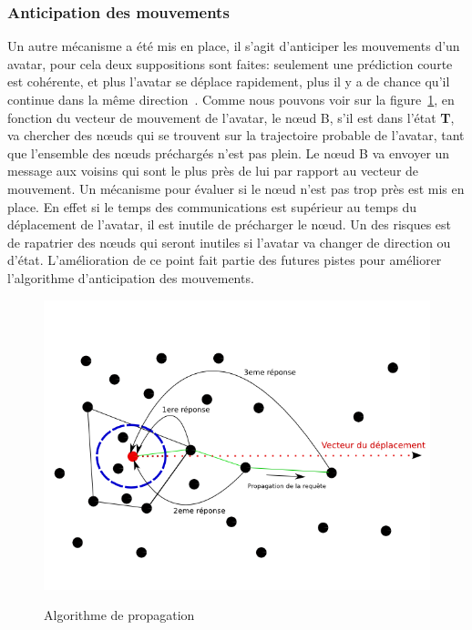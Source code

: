 



	\subsubsection{Anticipation des mouvements}
	Un autre mécanisme a été mis en place, il s'agit d'anticiper les mouvements d'un avatar, pour cela deux suppositions sont faites: seulement une prédiction courte est cohérente, et plus l'avatar se déplace rapidement, plus il y a de chance qu'il continue dans la même direction~\cite{191}. Comme nous pouvons voir sur la figure~\ref{Propa_Algo}, en fonction du vecteur de mouvement de l'avatar, le nœud B, s'il est dans l'état \textbf{T}, va chercher des nœuds qui se trouvent sur la trajectoire probable de l'avatar, tant que l'ensemble des nœuds préchargés n'est pas plein. Le nœud B va envoyer un message aux voisins qui sont le plus près de lui par rapport au vecteur de mouvement. Un mécanisme pour évaluer si le nœud n'est pas trop près est mis en place. En effet si le temps des communications est supérieur au temps du déplacement de l'avatar, il est inutile de précharger le nœud. Un des risques est de rapatrier des nœuds qui seront inutiles si l'avatar va changer de direction ou d'état. L'amélioration de ce point fait partie des futures pistes pour améliorer l'algorithme d'anticipation des mouvements.\\
	\vspace{5mm}
        \begin{figure}[!h]
        \centering
        \includegraphics[scale=0.5]{./Ressources/Images/propagation_algo.png}\\
        \caption{Algorithme de propagation}
        \label{Propa_Algo}
        \end{figure}
        \vspace{5mm}

